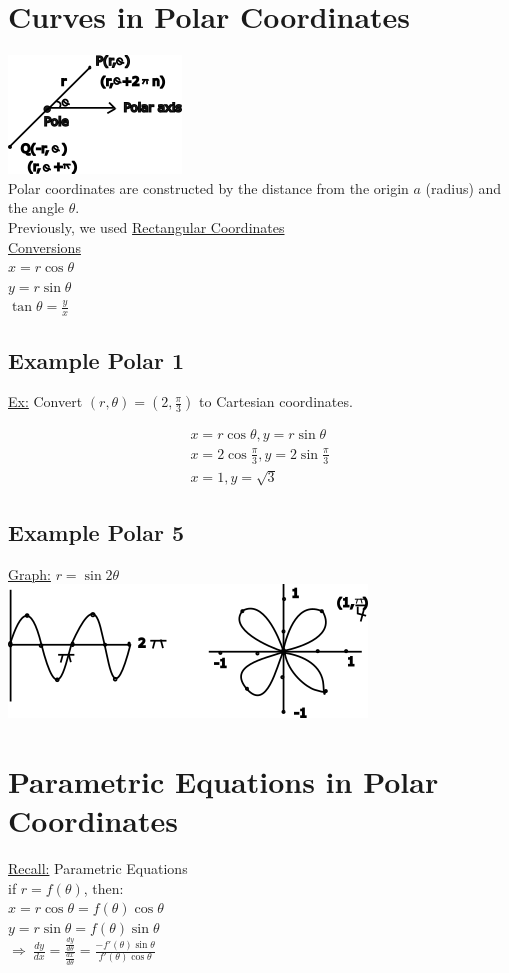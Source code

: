 \documentclass[12pt]{article}
\begin{document}
\section{Curves in Polar Coordinates}
\includegraphics{polarcoordinates}\\%
Polar coordinates are constructed by the distance from the origin $a$ (radius) and the angle $\theta$.\\%
Previously, we used \underline{Rectangular Coordinates}\\%
\underline{Conversions}\\%
$x=r\cos\theta$\\%
$y=r\sin\theta$\\%
$\tan\theta=\frac{y}{x}$

\subsection{Example Polar 1}
\underline{Ex:} Convert $(r,\theta)=(2,\frac{\pi}{3})$ to Cartesian coordinates.

\begin{align}
	x=r \cos\theta, y=r \sin\theta\\%
	x=2 \cos \frac{\pi}{3}, y=2 \sin \frac{\pi}{3}\\%
	x=1, y=\sqrt{3}
\end{align}

\subsection{Example Polar 5}
\underline{Graph:} $r=\sin2\theta$\\%
\includegraphics{flowerpolar}

\section{Parametric Equations in Polar Coordinates}
\underline{Recall:} Parametric Equations\\%
if $r=f(\theta)$, then:\\%
$x=r\cos\theta = f(\theta)\cos\theta$\\%
$y=r\sin\theta=f(\theta)\sin\theta$\\%
$\Rightarrow\ \frac{dy}{dx}=\frac{\frac{dy}{d\theta}}{\frac{dx}{d\theta}}= \frac{-f'(\theta)\sin\theta}{f'(\theta)\cos\theta}$
\end{document}
